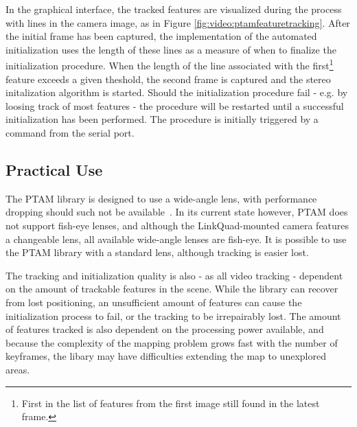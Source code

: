 
            In the graphical interface, the tracked features are visualized
            during the process with lines in the camera image, as in Figure \ref{fig:video:ptamfeaturetracking}.
            After the initial frame has been captured, the implementation
            of the automated initialization uses the length of these lines as
            a measure of when to finalize the initialization procedure.
            When the length of the line associated with the first\footnote{First in the list of features from the first image still found in the latest frame.}
            feature exceeds a given theshold, the second frame is
            captured and the stereo initalization algorithm is started.
            Should the initialization procedure fail - e.g. by loosing track of most features - the
            procedure will be restarted until a successful initialization has been performed.
            The procedure is initially triggered by a command from the serial port.

        \subsection{Practical Use}
            The PTAM library is designed to use a wide-angle lens, with
            performance dropping should such not be available~\citep{klein07parallel}.
            In its current state however, PTAM does not support fish-eye lenses, and although
            the LinkQuad-mounted camera features a changeable lens, all
            available wide-angle lenses are fish-eye.
            It is possible to use the PTAM library with a standard lens, although
            tracking is easier lost.

            The tracking and initialization quality is also - as all video tracking - dependent on the
            amount of trackable features in the scene.
            While the library can recover from lost positioning, an unsufficient amount
            of features can cause the initialization process to fail, or the tracking to
            be irrepairably lost.
            The amount of features tracked is also dependent on the processing
            power available, and because the complexity of the mapping
            problem grows fast with the number of keyframes, the libary may
            have difficulties extending the map to unexplored areas.
